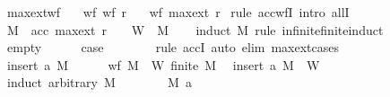 \begin{isabellebody}
\isanewline
{}\isamarkupfalse%
\ max{\isacharunderscore}{\kern0pt}ext{\isacharunderscore}{\kern0pt}wf{\isacharcolon}{\kern0pt}\isanewline
\ \ \ wf{\isacharcolon}{\kern0pt}\ {\isachardoublequoteopen}wf\ r{\isachardoublequoteclose}\isanewline
\ \ \ {\isachardoublequoteopen}wf\ {\isacharparenleft}{\kern0pt}max{\isacharunderscore}{\kern0pt}ext\ r{\isacharparenright}{\kern0pt}{\isachardoublequoteclose}\isanewline
%
\isadelimproof
%
\endisadelimproof
%
\isatagproof
{}\isamarkupfalse%
\ {\isacharparenleft}{\kern0pt}rule\ acc{\isacharunderscore}{\kern0pt}wfI{\isacharcomma}{\kern0pt}\ intro\ allI{\isacharparenright}{\kern0pt}\isanewline
\ \ \isamarkupfalse%
\ {\isachardoublequoteopen}M\ {\isasymin}\ acc\ {\isacharparenleft}{\kern0pt}max{\isacharunderscore}{\kern0pt}ext\ r{\isacharparenright}{\kern0pt}{\isachardoublequoteclose}\ {\isacharparenleft}{\kern0pt}\ {\isachardoublequoteopen}{\isacharunderscore}{\kern0pt}\ {\isasymin}\ {\isacharquery}{\kern0pt}W{\isachardoublequoteclose}{\isacharparenright}{\kern0pt}\ \ M\isanewline
\ \ \isamarkupfalse%
\ {\isacharparenleft}{\kern0pt}induct\ M\ rule{\isacharcolon}{\kern0pt}\ infinite{\isacharunderscore}{\kern0pt}finite{\isacharunderscore}{\kern0pt}induct{\isacharparenright}{\kern0pt}\isanewline
\ \ \ \ \isamarkupfalse%
\ empty\isanewline
\ \ \ \ \isamarkupfalse%
\ {\isacharquery}{\kern0pt}case\isanewline
\ \ \ \ \ \ \isamarkupfalse%
\ {\isacharparenleft}{\kern0pt}rule\ accI{\isacharparenright}{\kern0pt}\ {\isacharparenleft}{\kern0pt}auto\ elim{\isacharcolon}{\kern0pt}\ max{\isacharunderscore}{\kern0pt}ext{\isachardot}{\kern0pt}cases{\isacharparenright}{\kern0pt}\isanewline
\ \ \isamarkupfalse%
\isanewline
\ \ \ \ \isamarkupfalse%
\ {\isacharparenleft}{\kern0pt}insert\ a\ M{\isacharparenright}{\kern0pt}\isanewline
\ \ \ \ \isamarkupfalse%
\ wf\ {\isacartoucheopen}M\ {\isasymin}\ {\isacharquery}{\kern0pt}W{\isacartoucheclose}\ {\isacartoucheopen}finite\ M{\isacartoucheclose}\ \isamarkupfalse%
\ {\isachardoublequoteopen}insert\ a\ M\ {\isasymin}\ {\isacharquery}{\kern0pt}W{\isachardoublequoteclose}\isanewline
\ \ \ \ \isamarkupfalse%
\ {\isacharparenleft}{\kern0pt}induct\ arbitrary{\isacharcolon}{\kern0pt}\ M{\isacharparenright}{\kern0pt}\isanewline
\ \ \ \ \ \ \isamarkupfalse%
\ M\ a\isanewline
\ \ \ \ \ \ \isamarkupfalse%

\end{isabellebody}
